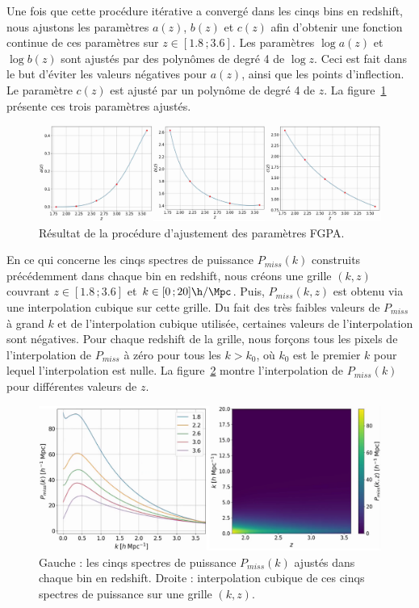 \documentclass[11pt, twoside, a4paper, openright]{report}
\begin{document}
Une fois que cette procédure itérative a convergé dans les cinqs bins en redshift, nous ajustons les paramètres $a(z)$, $b(z)$ et $c(z)$ afin d'obtenir une fonction continue de ces paramètres sur $z \in [\num{1.8} \, ; \num{3.6}]$. Les paramètres $\log a(z)$ et $\log b(z)$ sont ajustés par des polynômes de degré 4 de $\log z$. Ceci est fait dans le but d'éviter les valeurs négatives pour $a(z)$, ainsi que les points d'inflection. Le paramètre $c(z)$ est ajusté par un polynôme de degré 4 de $z$. La figure~\ref{fig:params} présente ces trois paramètres ajustés.
\begin{figure}
  \centering
  \includegraphics[scale=0.45]{params}
  \caption{Résultat de la procédure d'ajustement des paramètres FGPA.}
  \label{fig:params}
\end{figure}
En ce qui concerne les cinqs spectres de puissance $P_{miss}(k)$ construits précédemment dans chaque bin en redshift, nous créons une grille $(k, z)$ couvrant $z \in [\num{1.8} \, ; \num{3.6}]$ et $k \in [\num{0} \, ; \num{20}] \si{\h\per\Mpc}$. Puis, $P_{miss}(k,z)$ est obtenu via une interpolation cubique sur cette grille. Du fait des très faibles valeurs de $P_{miss}$ à grand $k$ et de l'interpolation cubique utilisée, certaines valeurs de l'interpolation sont négatives. Pour chaque redshift de la grille, nous forçons tous les pixels de l'interpolation de $P_{miss}$ à zéro pour tous les $k > k_0$, où $k_0$ est le premier $k$ pour lequel l'interpolation est nulle. La figure~\ref{fig:p1dmiss} montre l'interpolation de $P_{miss}(k)$ pour différentes valeurs de $z$. 
\begin{figure}
  \centering
  \includegraphics[scale=0.4]{p1dmiss}
  \caption{Gauche : les cinqs spectres de puissance $P_{miss}(k)$ ajustés dans chaque bin en redshift. Droite : interpolation cubique de ces cinqs spectres de puissance sur une grille $(k, z)$.}
  \label{fig:p1dmiss}
\end{figure}
\end{document}
